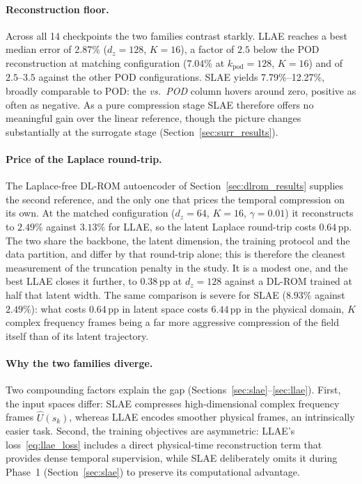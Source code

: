 ﻿\documentclass[a4paper,12pt]{article}
\theoremstyle{definition}
\theoremstyle{remark}
\begin{document}
\paragraph{Reconstruction floor.}
Across all 14 checkpoints the two families contrast starkly. LLAE reaches a best median error of 2.87\% ($d_z=128$, $K=16$), a factor of $2.5$ below the POD reconstruction at matching configuration ($7.04\%$ at $k_{\mathrm{pod}}=128$, $K=16$) and of $2.5$--$3.5$ against the other POD configurations. SLAE yields 7.79\%--12.27\%, broadly comparable to POD: the \emph{vs.\ POD} column hovers around zero, positive as often as negative. As a pure compression stage SLAE therefore offers no meaningful gain over the linear reference, though the picture changes substantially at the surrogate stage (Section~\ref{sec:surr_results}).

\paragraph{Price of the Laplace round-trip.}
The Laplace-free DL-ROM autoencoder of Section~\ref{sec:dlrom_results} supplies the second reference, and the only one that prices the temporal compression on its own. At the matched configuration ($d_z = 64$, $K = 16$, $\gamma = 0.01$) it reconstructs to $2.49$\% against $3.13$\% for LLAE, so the latent Laplace round-trip costs $0.64$\,pp. The two share the backbone, the latent dimension, the training protocol and the data partition, and differ by that round-trip alone; this is therefore the cleanest measurement of the truncation penalty in the study. It is a modest one, and the best LLAE closes it further, to $0.38$\,pp at $d_z = 128$ against a DL-ROM trained at half that latent width. The same comparison is severe for SLAE ($8.93$\% against $2.49$\%): what costs $0.64$\,pp in latent space costs $6.44$\,pp in the physical domain, $K$ complex frequency frames being a far more aggressive compression of the field itself than of its latent trajectory.

\paragraph{Why the two families diverge.}
Two compounding factors explain the gap (Sections~\ref{sec:slae}--\ref{sec:llae}). First, the input spaces differ: SLAE compresses high-dimensional complex frequency frames $\hat{U}(s_k)$, whereas LLAE encodes smoother physical frames, an intrinsically easier task. Second, the training objectives are asymmetric: LLAE's loss~\eqref{eq:llae_loss} includes a direct physical-time reconstruction term that provides dense temporal supervision, while SLAE deliberately omits it during Phase~1 (Section~\ref{sec:slae}) to preserve its computational advantage.
\end{document}
